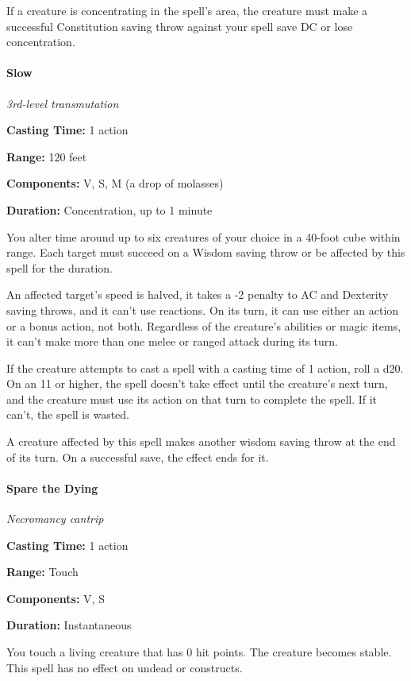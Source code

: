 \documentclass[
]{article}
\begin{document}
If a creature is concentrating in the spell's area, the creature must
make a successful Constitution saving throw against your spell save DC
or lose concentration.

\hypertarget{slow}{%
\paragraph{Slow}\label{slow}}

\emph{3rd-level transmutation}

\textbf{Casting Time:} 1 action

\textbf{Range:} 120 feet

\textbf{Components:} V, S, M (a drop of molasses)

\textbf{Duration:} Concentration, up to 1 minute

You alter time around up to six creatures of your choice in a 40-foot
cube within range. Each target must succeed on a Wisdom saving throw or
be affected by this spell for the duration.

An affected target's speed is halved, it takes a -2 penalty to AC and
Dexterity saving throws, and it can't use reactions. On its turn, it can
use either an action or a bonus action, not both. Regardless of the
creature's abilities or magic items, it can't make more than one melee
or ranged attack during its turn.

If the creature attempts to cast a spell with a casting time of 1
action, roll a d20. On an 11 or higher, the spell doesn't take effect
until the creature's next turn, and the creature must use its action on
that turn to complete the spell. If it can't, the spell is wasted.

A creature affected by this spell makes another wisdom saving throw at
the end of its turn. On a successful save, the effect ends for it.

\hypertarget{spare-the-dying}{%
\paragraph{Spare the Dying}\label{spare-the-dying}}

\emph{Necromancy cantrip}

\textbf{Casting Time:} 1 action

\textbf{Range:} Touch

\textbf{Components:} V, S

\textbf{Duration:} Instantaneous

You touch a living creature that has 0 hit points. The creature becomes
stable. This spell has no effect on undead or constructs.
\end{document}
